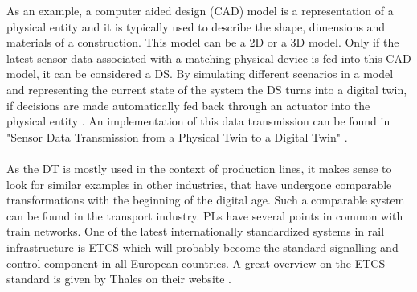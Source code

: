As an example, a computer aided design (CAD) model is a representation of a physical entity and it is typically used to describe the shape, dimensions and materials of a construction. This model can be a 2D or a 3D model. Only if the latest sensor data associated with a matching physical device is fed into this CAD model, it can be considered a DS. \cite{WongWhatisDT} By simulating different scenarios in a model and representing the current state of the system the DS turns into a digital twin, if decisions are made automatically fed back through an actuator into the physical entity \cite{SchleichDTshaping}.
An implementation of this data transmission can be found in "Sensor Data Transmission from a Physical Twin to a Digital Twin" \cite{AlaDTdataTransmission}.\\
\\
As the \ac{DT} is mostly used in the context of production lines, it makes sense to look for similar examples in other industries, that have undergone comparable transformations with the beginning of the digital age.
Such a comparable system can be found in the transport industry. 
\acp{PL} have several points in common with train networks.
One of the latest internationally standardized systems in rail infrastructure is \ac{ETCS} which will probably become the standard signalling and control component in all European countries. 
A great overview on the \ac{ETCS}-standard is given by Thales on their website \cite{ThalesETCS}.\\

